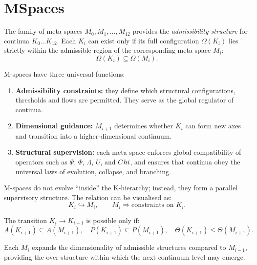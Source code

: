 

\section{MSpaces}
\label{sec:mspaces-overview}

The family of meta-spaces $M_0, M_1, \dots, M_{12}$ provides the
\emph{admissibility structure} for continua $K_0\dots K_{12}$.
Each $K_i$ can exist only if its full configuration
$\Omega(K_i)$ lies strictly within the admissible region of the corresponding
meta-space $M_i$:
\[
\Omega(K_i) \subseteq \Omega(M_i).
\]

M-spaces have three universal functions:

\begin{enumerate}
    \item \textbf{Admissibility constraints:}
    they define which structural configurations, thresholds and flows are permitted.
    They serve as the global regulator of continua.

    \item \textbf{Dimensional guidance:}
    $M_{i+1}$ determines whether $K_i$ can form new axes and transition
    into a higher-dimensional continuum.

    \item \textbf{Structural supervision:}
    each meta-space enforces global compatibility of operators
    such as $\Psi$, $\Phi$, $\Lambda$, $U$, and $Chi$, and ensures that
    continua obey the universal laws of evolution, collapse, and branching.
\end{enumerate}

M-spaces do not evolve “inside” the K-hierarchy; instead,
they form a parallel supervisory structure.
The relation can be visualised as:
\[
K_i \hookrightarrow M_i,\qquad 
M_i \Rightarrow \text{constraints on } K_i.
\]

The transition $K_i \to K_{i+1}$ is possible only if:
\[
A(K_{i+1}) \subseteq A(M_{i+1}), \quad
P(K_{i+1}) \subseteq P(M_{i+1}),\quad
\Theta(K_{i+1}) \leq \Theta(M_{i+1}).
\]

Each $M_i$ expands the dimensionality of admissible structures compared to
$M_{i-1}$, providing the over-structure within which the next continuum level
may emerge.

